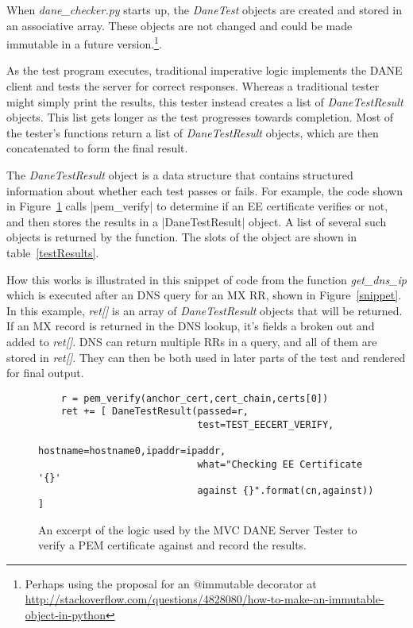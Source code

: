 \documentclass[preprint,3p,11pt]{elsarticle}
\begin{document}
When \emph{dane\_checker.py} starts up, the \emph{DaneTest} objects are created
and stored in an associative array. These objects are not changed and
could be made immutable in a future version.\footnote{Perhaps using
  the proposal for an @immutable decorator at \url{http://stackoverflow.com/questions/4828080/how-to-make-an-immutable-object-in-python}}.

As the test program executes, traditional imperative logic implements
the DANE client and tests the server for correct responses. Whereas a
traditional tester might simply print the results, this tester instead
creates a list of \emph{DaneTestResult} objects. This list gets longer
as the test progresses towards completion. Most of the tester's
functions return a list of \emph{DaneTestResult} objects, which are
then concatenated to form the final result.

The \emph{DaneTestResult} object is a data structure that contains
structured information about whether each test passes or fails. For
example, the code shown in Figure~\ref{pem-snippet} calls |pem_verify|
to determine if an EE certificate verifies or not, and then stores the
results in a |DaneTestResult| object. A list of several such objects
is returned by the function. The slots of the object are shown in table~\ref{testResults}.



How this works is illustrated in this snippet of code from the
function \emph{get\_dns\_ip} which is executed after an DNS query for
an MX RR, shown in Figure~\ref{snippet}. In this example, \emph{ret[]} is an array of \emph{DaneTestResult}
objects that will be returned. If an MX record is returned in the DNS
lookup, it's fields a broken out and added to \emph{ret[]}. DNS can
return multiple RRs in a query, and all of them are stored in
\emph{ret[]}.  They can then be both used in later parts of the test
and rendered for final output.


\begin{figure}
\begin{lstlisting}
    r = pem_verify(anchor_cert,cert_chain,certs[0])
    ret += [ DaneTestResult(passed=r,
                            test=TEST_EECERT_VERIFY,
                            hostname=hostname0,ipaddr=ipaddr,
                            what="Checking EE Certificate '{}'
                            against {}".format(cn,against)) ]

\end{lstlisting}
\caption{An excerpt of the logic used by the MVC DANE Server Tester to
  verify a PEM certificate against and record the results.}\label{pem-snippet}
\end{figure}
\end{document}
